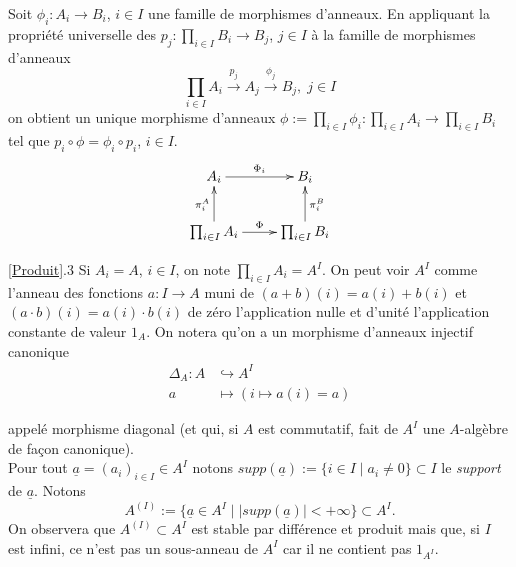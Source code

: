 \documentclass[a4paper, oneside, 12pt]{book}
\theoremstyle{theoremeStyle} %
\theoremstyle{definition} %
\begin{document}
   Soit $\phi_i:A_i\rightarrow B_i$, $i\in I$ une famille de morphismes d'anneaux. En appliquant la propriété universelle des $p_j:\prod_{i\in I}B_i\rightarrow B_j$, $j\in I$ à la famille de morphismes d'anneaux
$$ \prod_{i\in I}A_i\stackrel{p_j}{\rightarrow}A_j\stackrel{\phi_j}{\rightarrow} B_j,\; j\in I$$
on obtient un unique morphisme d'anneaux $\phi:=\prod_{i\in I}\phi_i:\prod_{i\in I}A_i\rightarrow \prod_{i\in I} B_i$ tel que $p_i\circ \phi=\phi_i\circ p_i$, $i\in I$. \\

	$$ \xymatrix{ A_i \ar[r]^{\Phi_i} & B_i \\ \prod_{i\in I} A_i \ar[u]^{\pi^A_i} \ar[r]^\Phi & \prod_{i\in I}B_i \ar[u]_{\pi^B_i} } $$

\ref{Produit}.3 Si $A_i=A$, $i\in I$, on note $\prod_{i\in I}A_i=A^I$. On peut  voir $A^I$ comme l'anneau des fonctions $a:I\rightarrow A$ muni de $(a+b)(i)=a(i)+b(i)$  et $(a\cdot b)(i)=a(i)\cdot b(i)$  de zéro l'application nulle et d'unité l'application constante de valeur $1_A$. On notera qu'on a un morphisme d'anneaux injectif canonique
	\begin{align*}
		\Delta_A : A &\hookrightarrow A^I \\
		a &\mapsto (i\mapsto a(i)=a)
	\end{align*}

	appelé morphisme diagonal (et qui, si $A$ est commutatif,   fait de $A^I$  une $A$-algèbre de fa\c{c}on canonique).\\

  Pour tout $\underline{a}=(a_i)_{i\in I}\in A^I$ notons $supp(\underline{a}):=\lbrace i\in I\; |\; a_i\not= 0\rbrace\subset I$ le \textit{support} de $\underline{a}$. Notons $$A^{(I)}:=\lbrace \underline{a}\in A^I\; |\; |supp(\underline{a})|<+\infty\rbrace \subset A^I.$$
On observera que $A^{(I)}\subset A^I$ est stable par différence et produit mais que, si $I$ est infini, ce n'est pas un sous-anneau de $A^I$ car il ne contient pas $1_{A^I}$.
\end{document}
